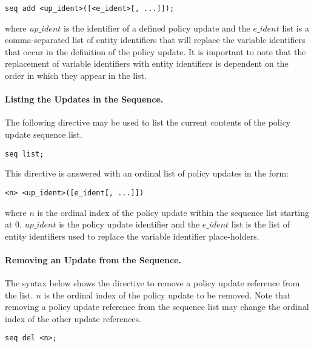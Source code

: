 \documentclass[10pt, twocolumn]{article}
\begin{document}
          \begin{verbatim}seq add <up_ident>([<e_ident>[, ...]]);\end{verbatim}

          \noindent where $up\_ident$ is the identifier of a defined policy
          update and the $e\_ident$ list is a comma-separated list of entity
          identifiers that will replace the variable identifiers that occur in
          the definition of the policy update. It is important to note that the
          replacement of variable identifiers with entity identifiers is
          dependent on the order in which they appear in the list.

        \paragraph{Listing the Updates in the Sequence.}
          The following directive may be used to list the current contents of
          the policy update sequence list.

          \begin{verbatim}seq list;\end{verbatim}

          This directive is answered with an ordinal list of policy updates in
          the form:

          \begin{verbatim}<n> <up_ident>([e_ident[, ...]])\end{verbatim}

          \noindent where $n$ is the ordinal index of the policy update within
          the sequence list starting at 0. $up\_ident$ is the policy update
          identifier and the $e\_ident$ list is the list of entity identifiers
          used to replace the variable identifier place-holders.

        \paragraph{Removing an Update from the Sequence.}
          The syntax below shows the directive to remove a policy update
          reference from the list. $n$ is the ordinal index of the policy
          update to be removed. Note that removing a policy update reference
          from the sequence list may change the ordinal index of the other
          update references.

          \begin{verbatim}seq del <n>;\end{verbatim}
\end{document}
